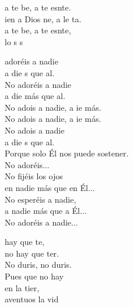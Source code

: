 \documentclass[12pt]{article}
\begin{document}
\begin{multicols*}{2}
\begin{cancion}%
	a te be, a te esnte.\\
	ien a Dios ne, a le ta.\\
	a te be, a te esnte,\\
	lo s s\\
\end{cancion}%

\begin{cancion}%
	 adoréis a nadie\\
	a die s que al. \\
No adoréis a nadie\\
	a die más que al.\\
	No adois a nadie, a ie más. \\
	No adois a nadie, a ie más. \\
	No adois a nadie \\
	a die s que al. \\
Porque solo Él nos puede sostener.\\
No adoréis...\\
No fijéis los ojos\\
en nadie más que en Él...\\
No esperéis a nadie,\\
a nadie más que a Él...\\
No adoréis a nadie...\\
\end{cancion}%

\begin{cancion}%
	 hay que te,\\
	no hay que ter.\\
	No duris, no duris. \\
	Pues que no hay \\
	en la tier,\\
	aventuos la vid\\
\end{cancion}%


\end{multicols*}
\end{document}
